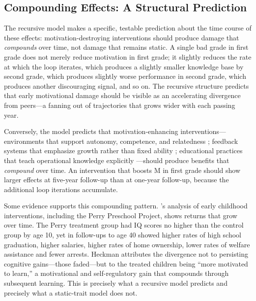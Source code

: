 \documentclass[12pt,a4paper]{article}
\begin{document}
\subsection{Compounding Effects: A Structural Prediction}

The recursive model makes a specific, testable prediction about the time course of these effects: motivation-destroying interventions should produce damage that \emph{compounds} over time, not damage that remains static. A single bad grade in first grade does not merely reduce motivation in first grade; it slightly reduces the rate at which the loop iterates, which produces a slightly smaller knowledge base by second grade, which produces slightly worse performance in second grade, which produces another discouraging signal, and so on. The recursive structure predicts that early motivational damage should be visible as an accelerating divergence from peers---\hspace{0pt}a fanning out of trajectories that grows wider with each passing year.

Conversely, the model predicts that motivation-enhancing interventions---\hspace{0pt}environments that support autonomy, competence, and relatedness \citep{DeciRyan2000}; feedback systems that emphasize growth rather than fixed ability \citep{Dweck2006}; educational practices that teach operational knowledge explicitly \citep{DignathButtner2008}---\hspace{0pt}should produce benefits that \emph{compound} over time. An intervention that boosts M in first grade should show larger effects at five-year follow-up than at one-year follow-up, because the additional loop iterations accumulate.

Some evidence supports this compounding pattern. \citeauthor{Heckman2006}'s \citeyearpar{Heckman2006} analysis of early childhood interventions, including the Perry Preschool Project, shows returns that grow over time. The Perry treatment group had IQ scores no higher than the control group by age 10, yet in follow-ups to age 40 showed higher rates of high school graduation, higher salaries, higher rates of home ownership, lower rates of welfare assistance and fewer arrests. Heckman attributes the divergence not to persisting cognitive gains---\hspace{0pt}those faded---\hspace{0pt}but to the treated children being ``more motivated to learn,'' a motivational and self-regulatory gain that compounds through subsequent learning. This is precisely what a recursive model predicts and precisely what a static-trait model does not.
\end{document}

